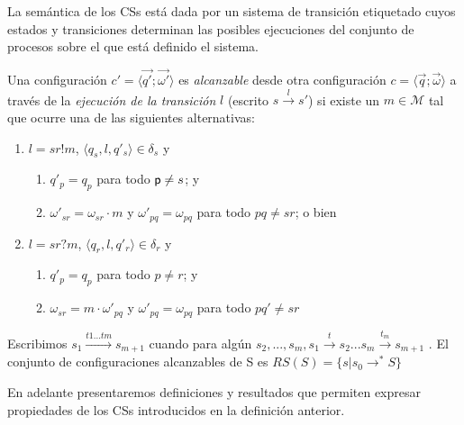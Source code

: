 La semántica de los CSs está dada por un sistema de transición etiquetado cuyos estados y transiciones determinan las posibles ejecuciones del conjunto de procesos sobre el que está definido el sistema.


\begin{definition}
\label{def:estadosyconf}
  Una configuración $c' = \langle \overrightarrow{q'} ; \overrightarrow{\omega'} \rangle$ es \emph{alcanzable} desde otra
  configuración $c = \langle \overrightarrow{q} ; \overrightarrow{\omega} \rangle$ a través de la \emph{ejecución de la transición} $l$ (escrito $s \overset{l}{\rightarrow} s'$) si existe un $m \in \mathcal{M}$ tal que ocurre una de las siguientes alternativas:
	\begin{enumerate}
		\item $l = sr!m$, $\langle q_s, l,  q'_s\rangle \in \delta_s$ y 
			\begin{enumerate}
				\item $q'_p = q_p$ para todo $\mathsf{p} \neq s$; y
				\item $\omega'_{sr} = \omega_{sr} \cdot m$ y  $\omega'_{pq} = \omega_{pq}$ para todo $pq \neq sr$; o bien
			\end{enumerate}
		\item $l = sr?m$, $\langle q_r, l,  q'_r\rangle \in \delta_r$ y 
			\begin{enumerate}
			\item $q'_{p} = q_{p}$ para todo $p \neq r$; y
				\item $\omega_{sr} = m \cdot \omega'_{pq}$ y $\omega'_{pq} = \omega_{pq}$ para todo $pq' \neq sr$
			\end{enumerate}
	\end{enumerate}
Escribimos $ s_1 \overset{t1...tm}{\rightarrow} s_{m+1}$ cuando para algún $s_2,...,s_m, s_1\overset{t}{\rightarrow} s_2...s_m\overset{t_m}{\rightarrow} s_{m+1} $ . El conjunto de configuraciones alcanzables de S es $RS(S) = \{s | s_0 \rightarrow^*S \}$
\end{definition}

En adelante presentaremos definiciones y resultados que permiten expresar propiedades de los CSs introducidos en la definición anterior.

